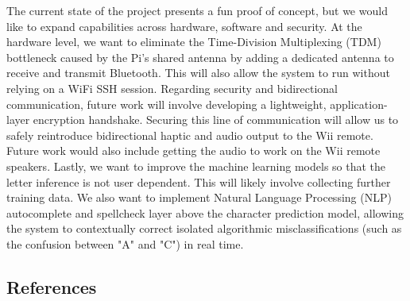 \documentclass[letterpaper,twocolumn,10pt]{article}
\begin{document}
The current state of the project presents a fun proof of concept, but we would like to expand capabilities across hardware, software and security. At the hardware level, we want to eliminate the Time-Division Multiplexing (TDM) bottleneck caused by the Pi's shared antenna by adding a dedicated antenna to receive and transmit Bluetooth. This will also allow the system to run without relying on a WiFi SSH session. 
Regarding security and bidirectional communication, future work will involve developing a lightweight, application-layer encryption handshake. Securing this line of communication will allow us to safely reintroduce bidirectional haptic and audio output to the Wii remote. Future work would also include getting the audio to work on the Wii remote speakers. 
Lastly, we want to improve the machine learning models so that the letter inference is not user dependent. This will likely involve collecting further training data. We also want to implement Natural Language Processing (NLP) autocomplete and spellcheck layer above the character prediction model, allowing the system to contextually correct isolated algorithmic misclassifications (such as the confusion between "A" and "C") in real time.

\subsection*{References}
\renewcommand{\refname}{\vspace{-1.5em}}    %


    
    
\end{document}

